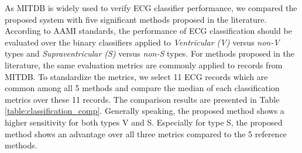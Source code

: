 \begin{table}[t]
\centering
\caption{Classification Performance and Within-Set Variation of Proposed System}
\label{table:variation}
\end{table}

As MITDB is widely used to verify ECG classifier performance, we compared the proposed system with five significant methods proposed in the literature. According to AAMI standards, the performance of ECG classification should be evaluated over the binary classifiers applied to \textit{Ventricular (V)} versus \textit{non-V} types and \textit{Supraventricular (S)} versus \textit{non-S} types. For methods proposed in the literature, the same evaluation metrics are commonly applied to records from MITDB. To standardize the metrics, we select 11 ECG records which are common among all 5 methods and compare the median of each classification metrics over these 11 records. The comparison results are presented in Table \ref{table:classification_comp}. Generally speaking, the proposed method shows a higher sensitivity for both types V and S. Especially for type S, the proposed method shows an advantage over all three metrics compared to the 5 reference methods.


